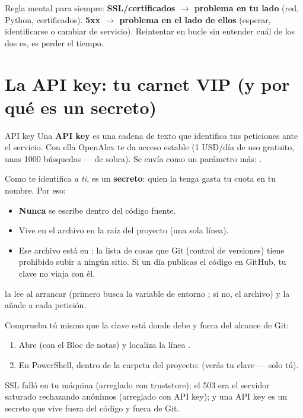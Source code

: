 \documentclass[11pt,a4paper]{article}
\begin{document}
\begin{ojo}
Regla mental para siempre: \textbf{SSL/certificados $\rightarrow$ problema en tu lado}
(red, Python, certificados). \textbf{5xx $\rightarrow$ problema en el lado de ellos}
(esperar, identificarse o cambiar de servicio). Reintentar en bucle sin entender cuál de
los dos es, es perder el tiempo.
\end{ojo}

\section{La API key: tu carnet VIP (y por qué es un secreto)}

\begin{concepto}{API key}
Una \textbf{API key} es una cadena de texto que identifica tus peticiones ante el
servicio. Con ella OpenAlex te da acceso estable (1 USD/día de uso gratuito, unas 1000
búsquedas — de sobra). Se envía como un parámetro más: .

Como te identifica \emph{a ti}, es un \textbf{secreto}: quien la tenga gasta tu cuota en
tu nombre. Por eso:
\begin{itemize}
  \item \textbf{Nunca} se escribe dentro del código fuente.
  \item Vive en el archivo  en la raíz del proyecto (una sola línea).
  \item Ese archivo está en : la lista de cosas que Git (control de
        versiones) tiene prohibido subir a ningún sitio. Si un día publicas el código en
        GitHub, tu clave no viaja con él.
\end{itemize}
 la lee al arrancar (primero busca la variable de entorno
; si no, el archivo) y  la añade a cada petición.
\end{concepto}

\begin{practica}
Comprueba tú mismo que la clave está donde debe y fuera del alcance de Git:
\begin{enumerate}
  \item Abre  (con el Bloc de notas) y localiza la línea .
  \item En PowerShell, dentro de la carpeta del proyecto:
         \quad (verás tu clave — solo tú).
\end{enumerate}
\end{practica}

\begin{resumen}
SSL falló en tu máquina (arreglado con truststore); el 503 era el servidor saturado
rechazando anónimos (arreglado con API key); y una API key es un secreto que vive fuera
del código y fuera de Git.
\end{resumen}
\end{document}
